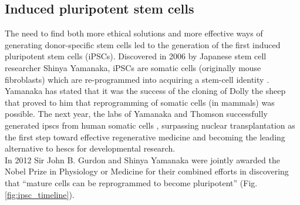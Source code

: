 \subsection{Induced pluripotent stem cells}
\label{sec:ipsc}

The need to find both more ethical solutions and more effective ways of generating donor-specific stem cells  led to the generation of the first induced pluripotent stem cells (iPSCs).
Discovered in 2006 by Japanese stem cell researcher Shinya Yamanaka, iPSCs are somatic cells (originally mouse fibroblasts) which are re-programmed into acquiring a stem-cell identity \cite{takahashi2006induction}.
Yamanaka has stated that it was the success of the cloning of Dolly the sheep that proved to him that reprogramming of somatic cells (in mammals) was possible.
The next year, the labs of Yamanaka and Thomson successfully generated \glspl{ipsc} from human somatic cells \cite{takahashi2006induction, takahashi2007induction, yu2007induced}, surpassing nuclear transplantation as the first step toward effective regenerative medicine and becoming the leading alternative to \glspl{hesc} for developmental research.\\

In 2012 Sir John B. Gurdon and Shinya Yamanaka were jointly awarded the Nobel Prize in Physiology or Medicine for their combined efforts in discovering that “mature cells can be reprogrammed to become pluripotent” \cite{nobel2012press} (Fig. \ref{fig:ipsc_timeline}).    






